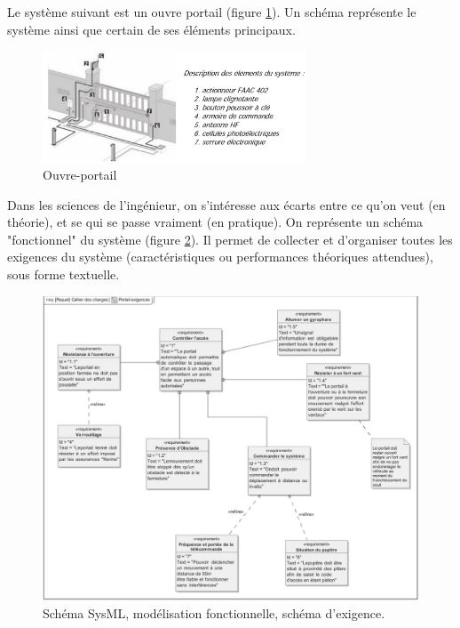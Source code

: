 \documentclass[
	11pt, %
	fleqn, %
	a4paper, %
]{LegrandOrangeBook}
\begin{document}
Le système suivant est un ouvre portail (figure \ref{Port1}). Un schéma représente le système ainsi que certain de ses éléments principaux.
\begin{figure}[H] %
	\centering %
	\includegraphics[width=0.7\textwidth]{Images/port1.JPG} %
	\caption{Ouvre-portail}
	\label{Port1} %
\end{figure}
Dans les sciences de l'ingénieur, on s'intéresse aux écarts entre ce qu'on veut (en théorie), et se qui se passe vraiment (en pratique). On représente un schéma "fonctionnel" du système (figure \ref{Port2}). Il permet de collecter et d'organiser toutes les exigences du système (caractéristiques ou performances théoriques attendues), sous forme textuelle. 
\begin{figure}[H] %
	\centering %
	\includegraphics[width=1\textwidth]{Images/port2.JPG} %
	\caption{Schéma SysML, modélisation fonctionnelle, schéma d'exigence.}
	\label{Port2} %
\end{figure}
\end{document}
